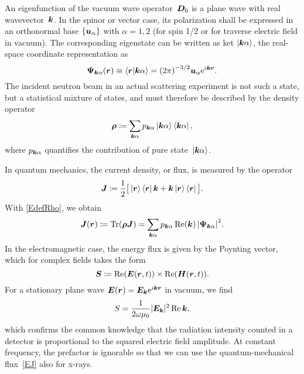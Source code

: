 An eigenfunction of the vacuum wave operator~$\bm{D}_0$ is a plane wave
with real wavevector~${\bm{k}}$.
%
In the spinor or vector case, its polarization shall be expressed
in an orthonormal base $\{\bm{u}_\alpha\}$
with $\alpha=1,2$
(for spin 1/2 or for traverse electric field in vacuum).
The corresponding eigenstate can be written as ket $\ket{{{\bm{k}}\alpha}}$,
the real-space coordinate representation as
\begin{equation}
   \bm{\Psi}_{{\bm{k}}\alpha}(\bm{r})
   \equiv \braket{\bm{r}|{{\bm{k}}\alpha}}
   = {(2\pi)}^{-3/2} \bm{u}_\alpha \mathrm e^{i{\bm{k}}\bm{r}}.
\end{equation}
The incident neutron beam in an actual scattering experiment
is not such a  state,
%
%
but a statistical mixture of states,
%
and must therefore be described by the density operator
%
%
\begin{equation}\label{EdefRho}
  \v\rho \coloneqq \sum_\ka p_\ka \ket\ka\bra\ka,
\end{equation}
where $p_{{\bm{k}}\alpha}$ quantifies the contribution of pure state~$\ket{{{\bm{k}}\alpha}}$.
%

In quantum mechanics, the current density, or flux, is measured by the operator
\begin{equation}\label{EdefJop}
  \v{J}
  \coloneqq \frac{1}{2}\big[\ket{\r}\bra{\r}\k
                              + \k\ket{\r}\bra{\r} \big].
\end{equation}
%
%
With \cref{EdefRho}, we obtain
\begin{equation}\label{EJ}
  \v{J}(\r)
  \coloneqq \Tr(\v\rho\v{J})
  = \sum_\ka p_\ka\, \text{Re}(\k)\, {\left|{\v\Psi_\ka}\right|}^2.
\end{equation}
%
In the electromagnetic case, the energy flux is given by the Poynting vector,
%
%
%
which for complex fields takes the form
\begin{equation}
  \bm{S}\coloneqq \operatorname{Re}(\bm{E}(\bm{r},t))\times\operatorname{Re}(\bm{H}(\bm{r},t)).
\end{equation}
%
For a stationary plane wave $\bm{E}(\bm{r})=\bm{E}_{\bm{k}} \mathrm e^{i{\bm{k}}\bm{r}}$ in vacuum,
we find
\begin{equation}
  S = \frac{1}{2\omega\mu_0} |\bm{E}_{\bm{k}}|^2 \operatorname{Re} {\bm{k}},
\end{equation}
which confirms the common knowledge that the radiation intensity
counted in a detector is proportional to the squared electric field amplitude.
At constant frequency, the prefactor is ignorable
so that we can use the quantum-mechanical flux~\cref{EJ} also for x-rays.


